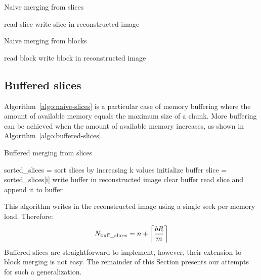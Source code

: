 \documentclass[10pt, conference, compsocconf]{IEEEtran}
\DeclarePairedDelimiter{\ceil}{\lceil}{\rceil}
\begin{document}
\begin{algorithm}
\caption{Naive merging from slices}
\label{algo:naive-slices} 
\begin{algorithmic}
    \STATE read slice
    \STATE write slice in reconstructed image
  \ENDFOR      
\end{algorithmic}
\end{algorithm}
\begin{algorithm}[h]
\caption{Naive merging from blocks}
\label{algo:naive-blocks}
\begin{algorithmic}
    \STATE read block
    \STATE write block in reconstructed image
  \ENDFOR 
\end{algorithmic}
\end{algorithm}


\subsection{Buffered slices}

Algorithm~\ref{algo:naive-slices} is a particular case of memory
buffering where the amount of available memory equals the maximum size
of a chunk. More buffering can be achieved when the amount of
available memory increases, as shown in
Algorithm~\ref{algo:buffered-slices}.
\begin{algorithm}[h]
  \caption{Buffered merging from slices}
  \label{algo:buffered-slices}
  \begin{algorithmic}[1]
    \STATE sorted\_slices = sort slices by increasing k values
    \STATE initialize buffer
      \STATE slice = sorted\_slices[i]
        \STATE write buffer in reconstructed image
        \STATE clear buffer
      \ENDIF
      \STATE read slice and append it to buffer
    \ENDFOR
  \end{algorithmic}
\end{algorithm}
This algorithm writes in the reconstructed image using a single seek
per memory load. Therefore:
\begin{equation}
N_\mathrm{buff\_slices} =  n + \ceil*{\frac{bR}{m}}
\end{equation}
Buffered slices are straightforward to implement, however, their
extension to block merging is not easy. The remainder of this Section
presents our attempts for such a generalization.
\end{document}
